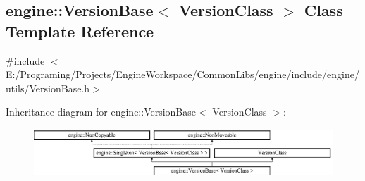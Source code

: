 \hypertarget{a00079}{}\subsection{engine\+:\+:Version\+Base$<$ Version\+Class $>$ Class Template Reference}
\label{a00079}


{\ttfamily \#include $<$E\+:/\+Programing/\+Projects/\+Engine\+Workspace/\+Common\+Libs/engine/include/engine/utils/\+Version\+Base.\+h$>$}

Inheritance diagram for engine\+:\+:Version\+Base$<$ Version\+Class $>$\+:\begin{figure}[H]
\begin{center}
\leavevmode
\includegraphics[height=1.800643cm]{a00079}
\end{center}
\end{figure}
